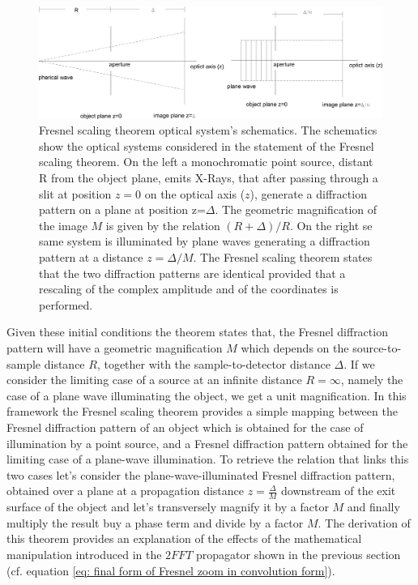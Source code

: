 \documentclass{iucr}              %
\begin{document}
\vspace{0.5 cm}
\begin{figure}
\caption{Fresnel scaling theorem optical system's schematics. The schematics show the optical systems considered in the statement of the Fresnel scaling theorem. On the left a monochromatic point source, distant R from the object plane, emits X-Rays, that after passing through a slit at position $z=0$ on the optical axis ($z$), generate a diffraction pattern on a plane at position z=$\Delta$. The geometric magnification of the image $M$ is given by the relation $(R+\Delta)/R$. On the right se same system is illuminated by plane waves generating a diffraction pattern at a distance $z=\Delta/M$. The Fresnel scaling theorem states that the two diffraction patterns are identical provided that a rescaling of the complex amplitude and of the coordinates is performed.} 
\centering
\includegraphics[width=1\textwidth]{./grafico_gio_paga.png}

\end{figure}

Given these initial conditions the theorem states that, the Fresnel diffraction pattern will have a geometric magnification $M$ which depends on the source-to-sample distance $R$, together with the sample-to-detector distance $\Delta$. If we consider the limiting case of a source at an infinite distance $R=\infty$, namely the case of a plane wave illuminating the object, we get a unit magnification. In this framework the Fresnel scaling theorem provides a simple mapping between the Fresnel diffraction pattern of an object which is obtained for the case of illumination by a point source, and a Fresnel diffraction pattern obtained for the limiting case of a plane-wave illumination. To retrieve the relation that links this two cases let's consider the plane-wave-illuminated Fresnel diffraction pattern, obtained over a plane at a propagation distance $z=\frac{\Delta}{M}$ downstream of the exit surface of the object and let's transversely magnify it by a factor $M$ and finally multiply the result buy a phase term and divide by a factor $M$. The derivation of this theorem provides an explanation of the effects of the mathematical manipulation introduced in the $2FFT$ propagator shown in the previous section (cf. equation \ref{eq: final form of Fresnel zoom in convolution form}).
\end{document}
